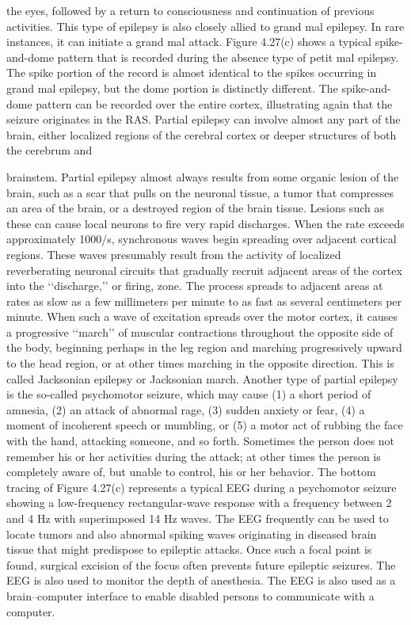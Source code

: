 the eyes, followed by a return to consciousness and continuation of previous
activities. This type of epilepsy is also closely allied to grand mal epilepsy. In
rare instances, it can initiate a grand mal attack.
Figure 4.27(c) shows a typical spike-and-dome pattern that is recorded
during the absence type of petit mal epilepsy. The spike portion of the record is
almost identical to the spikes occurring in grand mal epilepsy, but the dome
portion is distinctly different. The spike-and-dome pattern can be recorded
over the entire cortex, illustrating again that the seizure originates in the RAS.
Partial epilepsy can involve almost any part of the brain, either localized
regions of the cerebral cortex or deeper structures of both the cerebrum and

brainstem. Partial epilepsy almost always results from some organic lesion of
the brain, such as a scar that pulls on the neuronal tissue, a tumor that
compresses an area of the brain, or a destroyed region of the brain tissue.
Lesions such as these can cause local neurons to fire very rapid discharges.
When the rate exceeds approximately 1000/s, synchronous waves begin
spreading over adjacent cortical regions. These waves presumably result
from the activity of localized reverberating neuronal circuits that gradually
recruit adjacent areas of the cortex into the ‘‘discharge,’’ or firing, zone. The
process spreads to adjacent areas at rates as slow as a few millimeters per
minute to as fast as several centimeters per minute. When such a wave of
excitation spreads over the motor cortex, it causes a progressive ‘‘march’’ of
muscular contractions throughout the opposite side of the body, beginning
perhaps in the leg region and marching progressively upward to the head
region, or at other times marching in the opposite direction. This is called
Jacksonian epilepsy or Jacksonian march.
Another type of partial epilepsy is the so-called psychomotor seizure,
which may cause (1) a short period of amnesia, (2) an attack of abnormal rage,
(3) sudden anxiety or fear, (4) a moment of incoherent speech or mumbling, or
(5) a motor act of rubbing the face with the hand, attacking someone, and so
forth. Sometimes the person does not remember his or her activities during the
attack; at other times the person is completely aware of, but unable to control,
his or her behavior. The bottom tracing of Figure 4.27(c) represents a typical
EEG during a psychomotor seizure showing a low-frequency rectangular-wave
response with a frequency between 2 and 4 Hz with superimposed 14 Hz waves.
The EEG frequently can be used to locate tumors and also abnormal
spiking waves originating in diseased brain tissue that might predispose to
epileptic attacks. Once such a focal point is found, surgical excision of the focus
often prevents future epileptic seizures.
The EEG is also used to monitor the depth of anesthesia.
The EEG is also used as a brain–computer interface to enable disabled
persons to communicate with a computer.

